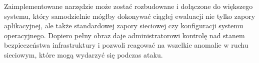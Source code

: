 \documentclass[11pt,a4paper,polish,thesis]{dcsbook}
\begin{document}
Zaimplementowane narzędzie może zostać rozbudowane i dołączone do większego systemu, który samodzielnie mógłby dokonywać ciągłej ewaluacji nie tylko zapory aplikacyjnej, ale także standardowej zapory sieciowej czy konfiguracji systemu operacyjnego. Dopiero pełny obraz daje administratorowi kontrolę nad stanem bezpieczeństwa infrastruktury i pozwoli reagować na wszelkie anomalie w ruchu sieciowym, które mogą wydarzyć się podczas ataku.

\appendix

\backmatter
\end{document}
